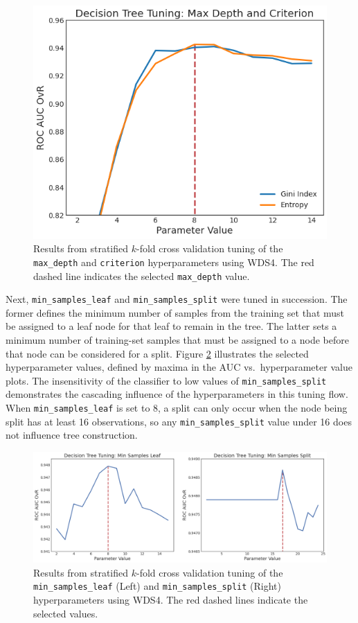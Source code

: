 \begin{figure}[!htp]
\centering
\includegraphics[width=.6\textwidth]{templates/images/Figure-DT_tuning_maxdepth_criterion.png}
\caption[Decision tree max depth tuning]{Results from stratified $k$-fold cross validation tuning of the \texttt{max\_depth} and \texttt{criterion} hyperparameters using WDS4. The red dashed line indicates the selected \texttt{max\_depth} value.}
\label{fig:dtree_maxdepth}
\end{figure}

Next, \verb|min_samples_leaf| and \verb|min_samples_split| were tuned in succession. The former defines the minimum number of samples from the training set that must be assigned to a leaf node for that leaf to remain in the tree. The latter sets a minimum number of training-set samples that must be assigned to a node before that node can be considered for a split. Figure \ref{fig:dtree_min_samples} illustrates the selected hyperparameter values, defined by maxima in the AUC vs.\ hyperparameter value plots. The insensitivity of the classifier to low values of \verb|min_samples_split| demonstrates the cascading influence of the hyperparameters in this tuning flow. When \verb|min_samples_leaf| is set to 8, a split can only occur when the node being split has at least 16 observations, so any \verb|min_samples_split| value under 16 does not influence tree construction. 

\begin{figure}[!htp]
\centering
\includegraphics[width=\textwidth]{templates/images/Figure-DT_tuning_min_samp_leaf_split.png}
\caption[Decision tree min samples tuning]{Results from stratified $k$-fold cross validation tuning of the \texttt{min\_samples\_leaf} (Left) and \texttt{min\_samples\_split} (Right) hyperparameters using WDS4. The red dashed lines indicate the selected values.}
\label{fig:dtree_min_samples}
\end{figure}

